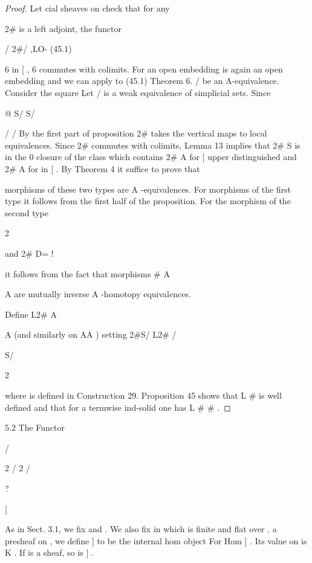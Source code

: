 \documentclass[11pt,a4paper]{article}
\theoremstyle{plain}
\theoremstyle{definition}
\begin{document}
\begin{proof} Let
cial sheaves on
check that for any



2\# is a left adjoint, the functor

/  2\#/ ,LO-
(45.1)

6 in [ ,  6
commutes with colimits. For an open embedding 
is again an open embedding and we can apply to (45.1) Theorem 6.
/  be an A-equivalence. Consider the square
Let  /
is a weak equivalence of simplicial sets. Since

@
S/  
S/  







/  / 
By the first part of proposition 2\# takes the vertical maps to local equivalences.
Since 2\# commutes with colimits, Lemma 13 implies that 2\# S  is in the 0
closure of the class which contains 2\#  A 
  for [ upper distinguished
and 2\#   A 
  for  in [ . By Theorem 4 it suffice to prove that

morphisms of these two types are A -equivalences. For morphisms of the first type
it follows from the first half of the proposition. For the morphism of the second type

2 

  and 2\# D=  !



it follows from the fact that morphisms \#
 A


 A are mutually inverse A -homotopy equivalences.

 
Define L2\# A





A (and similarly on AA  ) setting
2\#S/ 
L2\# / 

S/ 

2

where
is defined in Construction 29. Proposition 45 shows that L \# is well
defined and that for a termwise ind-solid one has L \#
 \# .

\end{proof}

5.2 The Functor 

/

 


2 /  2 / 



?

[

As in Sect. 3.1, we fix and . We also fix
in
which is finite and flat
over .
a presheaf on
, we define ] to be the internal hom object
For
Hom ]
. Its value on is
K . If is a sheaf, so is ] .
\end{document}
